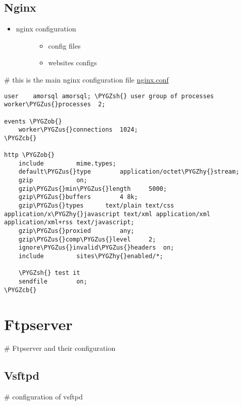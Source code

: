\documentclass[letterpaper,10pt,english]{sphinxmanual}
\def\PYGZus{\char`\_}
\def\PYGZob{\char`\{}
\def\PYGZcb{\char`\}}
\def\PYGZsh{\char`\#}
\def\PYGZhy{\char`\-}
\begin{document}
\subsection{Nginx}
\label{sdocs/webserver/nginx/nginx:nginx}\label{sdocs/webserver/nginx/nginx::doc}\begin{itemize}
\item {} \begin{description}
\item[{nginx configuration}] \leavevmode\begin{itemize}
\item {} 
config files

\item {} 
websites configs

\end{itemize}

\end{description}

\end{itemize}

\# this is the main nginx configuration file {\hyperref[sdocs/webserver/nginx/nginx:nginx-conf]{nginx.conf}}
\label{sdocs/webserver/nginx/nginx:nginx-conf}
\begin{Verbatim}[commandchars=\\\{\}]
user	amorsql amorsql; \PYGZsh{} user group of processes
worker\PYGZus{}processes  2;

events \PYGZob{}
	worker\PYGZus{}connections  1024;
\PYGZcb{}

http \PYGZob{}
	include			mime.types;
	default\PYGZus{}type		application/octet\PYGZhy{}stream;
	gzip			on;
	gzip\PYGZus{}min\PYGZus{}length		5000;
	gzip\PYGZus{}buffers		4 8k;
	gzip\PYGZus{}types		text/plain text/css application/x\PYGZhy{}javascript text/xml application/xml application/xml+rss text/javascript;
	gzip\PYGZus{}proxied		any;
	gzip\PYGZus{}comp\PYGZus{}level		2;
	ignore\PYGZus{}invalid\PYGZus{}headers	on;
	include			sites\PYGZhy{}enabled/*;
	
	\PYGZsh{} test it
	sendfile		on;
\PYGZcb{}
\end{Verbatim}


\section{Ftpserver}
\label{sdocs/ftpserver/ftpserver:ftpserver}\label{sdocs/ftpserver/ftpserver::doc}
\# Ftpserver and their configuration


\subsection{Vsftpd}
\label{sdocs/ftpserver/vsftpd/vsftpd:vsftpd}\label{sdocs/ftpserver/vsftpd/vsftpd::doc}
\# configuration of vsftpd
\end{document}
